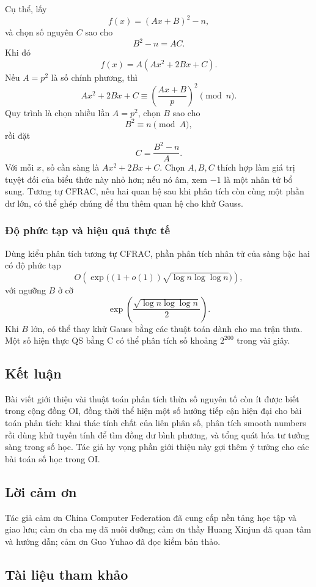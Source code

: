 \documentclass[11pt]{article}
\begin{document}
Cụ thể, lấy
\[
  f(x)=(Ax+B)^2-n,
\]
và chọn số nguyên \(C\) sao cho
\[
  B^2-n=AC.
\]
Khi đó
\[
  f(x)=A(Ax^2+2Bx+C).
\]
Nếu \(A=p^2\) là số chính phương, thì
\[
  Ax^2+2Bx+C\equiv \left(\frac{Ax+B}{p}\right)^2\pmod n.
\]
Quy trình là chọn nhiều lần \(A=p^2\), chọn \(B\) sao cho
\[
  B^2\equiv n\pmod A,
\]
rồi đặt
\[
  C=\frac{B^2-n}{A}.
\]
Với mỗi \(x\), số cần sàng là \(Ax^2+2Bx+C\). Chọn \(A,B,C\) thích hợp làm
giá trị tuyệt đối của biểu thức này nhỏ hơn; nếu nó âm, xem \(-1\) là một
nhân tử bổ sung. Tương tự CFRAC, nếu hai quan hệ sau khi phân tích còn cùng
một phần dư lớn, có thể ghép chúng để thu thêm quan hệ cho khử Gauss.

\subsubsection{Độ phức tạp và hiệu quả thực tế}

Dùng kiểu phân tích tương tự CFRAC, phần phân tích nhân tử của sàng bậc hai có
độ phức tạp
\[
  O\left(\exp\bigl((1+o(1))\sqrt{\log n\log\log n}\bigr)\right),
\]
với ngưỡng \(B\) ở cỡ
\[
  \exp\left(\frac{\sqrt{\log n\log\log n}}2\right).
\]
Khi \(B\) lớn, có thể thay khử Gauss bằng các thuật toán dành cho ma trận thưa.
Một số hiện thực QS bằng C có thể phân tích số khoảng \(2^{200}\) trong vài
giây.

\subsection{Kết luận}

Bài viết giới thiệu vài thuật toán phân tích thừa số nguyên tố còn ít được biết
trong cộng đồng OI, đồng thời thể hiện một số hướng tiếp cận hiện đại cho bài
toán phân tích: khai thác tính chất của liên phân số, phân tích smooth numbers
rồi dùng khử tuyến tính để tìm đồng dư bình phương, và tổng quát hóa tư tưởng
sàng trong số học. Tác giả hy vọng phần giới thiệu này gợi thêm ý tưởng cho
các bài toán số học trong OI.

\subsection{Lời cảm ơn}

Tác giả cảm ơn China Computer Federation đã cung cấp nền tảng học tập và giao
lưu; cảm ơn cha mẹ đã nuôi dưỡng; cảm ơn thầy Huang Xinjun đã quan tâm và
hướng dẫn; cảm ơn Guo Yuhao đã đọc kiểm bản thảo.

\subsection{Tài liệu tham khảo}
\end{document}
